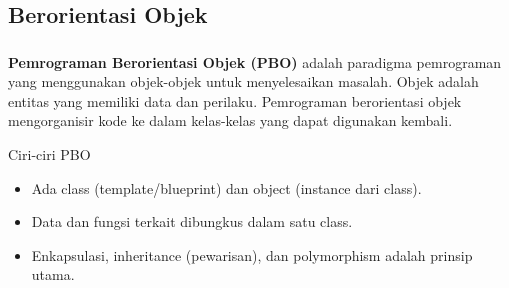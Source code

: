 \documentclass{../praktikum-ppt}
\begin{document}
  \subsection{Berorientasi Objek}
  \begin{frame}
    \frametitle{\insertsection}
    \framesubtitle{\insertsubsection}
    \begin{definisi}
      \textbf{Pemrograman Berorientasi Objek (PBO)} adalah paradigma pemrograman yang menggunakan objek-objek untuk menyelesaikan masalah. Objek adalah entitas yang memiliki data dan perilaku. Pemrograman berorientasi objek mengorganisir kode ke dalam kelas-kelas yang dapat digunakan kembali.
    \end{definisi}
    \begin{block}{Ciri-ciri PBO}
      \begin{itemize}
        \item Ada class (template/blueprint) dan object (instance dari class).
        \item Data dan fungsi terkait dibungkus dalam satu class.
        \item Enkapsulasi, inheritance (pewarisan), dan polymorphism adalah prinsip utama.
      \end{itemize}
    \end{block}
  \end{frame}
\end{document}

